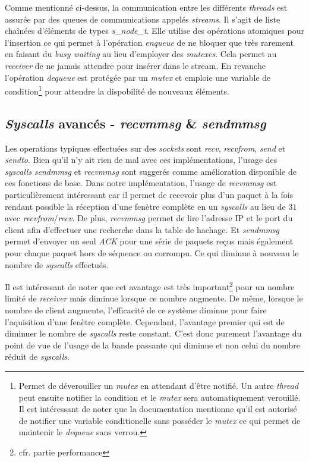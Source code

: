 \documentclass[../main.tex]{subfiles}
\begin{document}
Comme mentionné ci-dessus, la communication entre les différents \textit{threads} est assurée par des queues de communications appelés \textit{streams}.
Il s'agit de liste chaînées d'éléments de types \textit{s\_node\_t}. Elle utilise des opérations atomiques pour l'insertion ce qui permet
à l'opération \textit{enqueue} de ne bloquer que très rarement en faisant du \textit{busy waiting} au lieu d'employer des \textit{mutexes}. Cela permet
au \textit{receiver} de ne jamais attendre pour insérer dans le stream. En revanche l'opération \textit{dequeue} est protégée par un \textit{mutex} et
emploie une variable de condition\footnote{ Permet de déverouiller un \textit{mutex} en attendant d'être notifié. Un autre \textit{thread} peut ensuite notifier
la condition et le \textit{mutex} sera automatiquement verouillé. Il est intéressant de noter que la documentation mentionne qu'il est autorisé
de notifier une variable conditionelle sans posséder le \textit{mutex} ce qui permet de maintenir le \textit{dequeue} sans verrou. } pour attendre la dispobilité de nouveaux éléments.

\subsection{\textit{Syscalls} avancés - \textit{recvmmsg} \& \textit{sendmmsg}}
\label{sec:syscalls}

Les operations typiques effectuées sur des \textit{sockets} sont \textit{recv}, \textit{recvfrom}, \textit{send} et \textit{sendto}. Bien qu'il n'y ait rien
de mal avec ces implémentations, l'usage des \textit{syscalls} \textit{sendmmsg} et \textit{recvmmsg} sont suggerés comme amélioration disponible\cite{that_awesome_paper}
de ces fonctions de base. Dans notre implémentation, l'usage de \textit{recvmmsg} est particulièrement intéressant car il permet de recevoir plus d'un paquet à la fois
rendant possible la réception d'une fenètre complète en un \textit{syscalls} au lieu de $31$ avec \textit{recvfrom}/\textit{recv}. De plus, \textit{recvmmsg} permet
de lire l'adresse IP et le port du client afin d'effectuer une recherche dans la table de hachage. Et \textit{sendmmsg} permet d'envoyer un seul \textit{ACK} pour
une série de paquets reçus mais également pour chaque paquet hors de séquence ou corrompu. Ce qui diminue à nouveau le nombre de \textit{syscalls} effectués.

Il est intéressant de noter que cet avantage est très important\footnote{ cfr. partie performance} pour un nombre limité de \textit{receiver} mais diminue lorsque 
ce nombre augmente. De même, lorsque le nombre de client augmente, l'efficacité de ce système diminue pour faire l'aquisition d'une fenètre complète. 
Cependant, l'avantage premier qui est de diminuer le nombre de \textit{syscalls} reste constant. C'est donc purement l'avantage du point de vue de 
l'usage de la bande passante qui diminue et non celui du nombre réduit de \textit{syscalls}.
\end{document}
